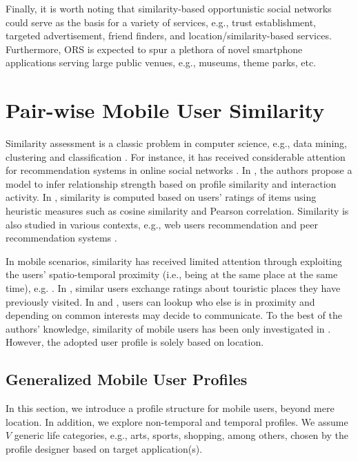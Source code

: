 \documentclass[12pt,epsf]{article}
\theoremstyle{definition}
\begin{document}
Finally, it is worth noting that similarity-based opportunistic social networks could serve as the basis for a variety of services, e.g., trust establishment, targeted advertisement, friend finders, and location/similarity-based services. Furthermore, ORS is expected to spur a plethora of novel smartphone applications serving large public venues, e.g., museums, theme parks, etc.
\vspace{-0.6 cm}
\section{Pair-wise Mobile User Similarity}
\vspace{-0.4 cm}
Similarity assessment is
a classic problem in computer science, e.g., data mining, 
clustering and classification \cite{dm1,dm2}. For instance, it has received
considerable attention for recommendation systems in online social networks \cite{soc1,soc2,cf,p2p}. In \cite{soc1}, the authors propose a model to 
infer relationship strength based on profile similarity and interaction 
activity. In \cite{soc2}, similarity is computed based on 
users' ratings of items using heuristic measures such as cosine 
similarity and Pearson correlation. Similarity is also studied in various 
contexts, e.g., web users recommendation \cite{cf} and peer
recommendation systems \cite{p2p}.

In mobile scenarios, similarity has received limited attention through
exploiting the users' spatio-temporal proximity (i.e., being at the same
place at the same time), e.g. \cite{lbd,ms,stp}. In \cite{stp}, similar 
users exchange ratings about touristic places they have previously visited. 
In \cite{lbd} and \cite{ms},
users can lookup who else is in proximity and depending on common interests
may decide to communicate. To the best of the authors' knowledge, 
similarity of mobile users has been only investigated in \cite{lbd,ms,loc1,loc2}.
However, the adopted user profile is solely based on location. 
%
\vspace{-0.3 cm}
\subsection{Generalized Mobile User Profiles}
\vspace{-0.2 cm}
In this section, we introduce a profile structure
for mobile users, beyond mere location. In addition, we explore 
non-temporal and temporal profiles. We assume $V$ generic life
categories, e.g., arts, sports, shopping, among others, chosen by 
the profile designer based on target application(s).
\end{document}
